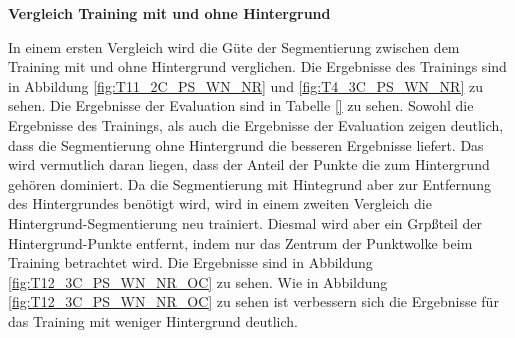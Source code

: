 \documentclass[12pt,titlepage, twoside]{article}
\begin{document}
\textbf{Vergleich Training mit und ohne Hintergrund}

In einem ersten Vergleich wird die Güte der Segmentierung zwischen dem Training mit und ohne Hintergrund verglichen. Die Ergebnisse des Trainings sind in Abbildung \ref{fig:T11_2C_PS_WN_NR} und \ref{fig:T4_3C_PS_WN_NR} zu sehen.
Die Ergebnisse der Evaluation sind in Tabelle \ref{} zu sehen. 
Sowohl die Ergebnisse des Trainings, als auch die Ergebnisse der Evaluation zeigen deutlich, dass die Segmentierung ohne Hintergrund die besseren Ergebnisse liefert.
Das wird vermutlich daran liegen, dass der Anteil der Punkte die zum Hintergrund gehören dominiert.
Da die Segmentierung mit Hintegrund aber zur Entfernung des Hintergrundes benötigt wird, wird in einem zweiten Vergleich die Hintergrund-Segmentierung neu trainiert. 
Diesmal wird aber ein Grpßteil der Hintergrund-Punkte entfernt, indem nur das Zentrum der Punktwolke beim Training betrachtet wird. Die Ergebnisse sind in Abbildung \ref{fig:T12_3C_PS_WN_NR_OC} zu sehen.
Wie in Abbildung \ref{fig:T12_3C_PS_WN_NR_OC} zu sehen ist verbessern sich die Ergebnisse für das Training mit weniger Hintergrund deutlich. 
\end{document}
